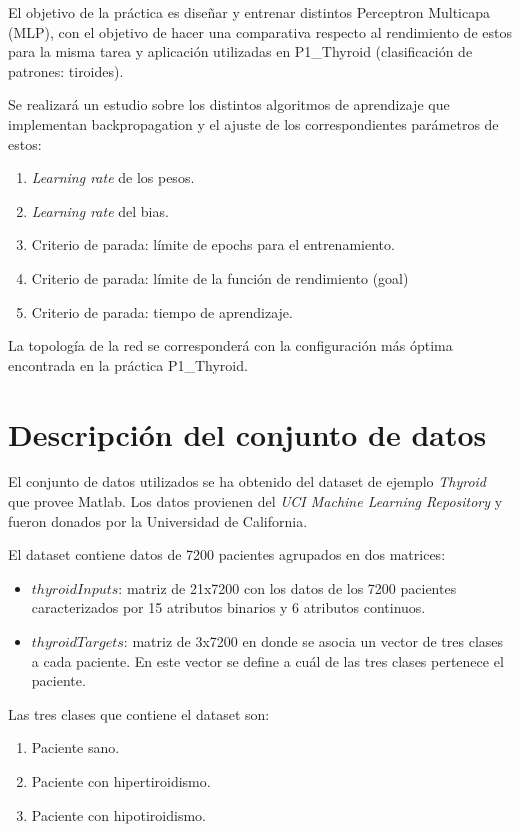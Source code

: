 \documentclass[a4paper,12pt,titlepage]{article}
\begin{document}
El objetivo de la práctica es diseñar y entrenar distintos Perceptron Multicapa (MLP), con el objetivo de hacer una comparativa respecto al rendimiento de estos para la misma tarea y aplicación utilizadas en P1\_Thyroid (clasificación de patrones: tiroides).

Se realizará un estudio sobre los distintos algoritmos de aprendizaje que
implementan backpropagation y el ajuste de los correspondientes parámetros de estos:

\begin{enumerate}[noitemsep]
	\item \textit{Learning rate} de los pesos.
	\item \textit{Learning rate} del bias.
	\item Criterio de parada: límite de epochs para el entrenamiento.
	\item Criterio de parada: límite de la función de rendimiento (goal)
	\item Criterio de parada: tiempo de aprendizaje.
\end{enumerate}

La topología de la red se corresponderá con la configuración más óptima encontrada en la práctica P1\_Thyroid.

\section{Descripción del conjunto de datos}

El conjunto de datos utilizados se ha obtenido del dataset de ejemplo \emph{Thyroid} que provee Matlab. Los datos provienen del \emph{UCI Machine Learning Repository} \citep{Asuncion+Newman:2007} y fueron donados por la Universidad de California.

El dataset contiene datos de 7200 pacientes agrupados en dos matrices:

\begin{itemize}[noitemsep]
	\item $thyroidInputs$: matriz de 21x7200 con los datos de los 7200 pacientes caracterizados por 15 atributos binarios y 6 atributos continuos.
	\item $thyroidTargets$: matriz de 3x7200 en donde se asocia un vector de tres clases a cada paciente. En este vector se define a cuál de las tres clases pertenece el paciente.
\end{itemize}

Las tres clases que contiene el dataset son:

\begin{enumerate}[noitemsep]
	\item Paciente sano.
	\item Paciente con hipertiroidismo.
	\item Paciente con hipotiroidismo.
\end{enumerate}
\end{document}

